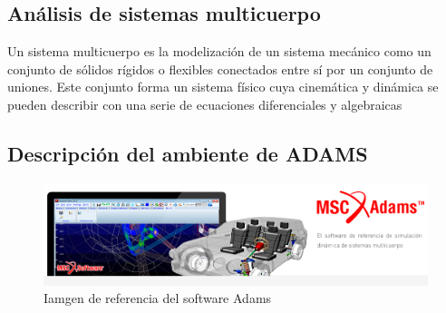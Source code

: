     \subsection{Análisis de sistemas multicuerpo}
    
    Un sistema multicuerpo es la modelización de un sistema mecánico como un conjunto de sólidos rígidos o flexibles conectados entre sí por un conjunto de uniones. Este conjunto forma un sistema físico cuya cinemática y dinámica se pueden describir con una serie de ecuaciones diferenciales y algebraicas
    
    \subsection{Descripción del ambiente de ADAMS}
    
    
    



    
    


    

    
    
    \begin{figure}[htb]
        \centering
        \includegraphics[width=1\linewidth]{Main/Chapter3/Images3/adams/logo_adams.png}
        \caption{Iamgen de referencia del software Adams}
        \label{f:Cap3-adams_logo}
    \end{figure} 
    

    
      
        
            
            
            

        
    
    